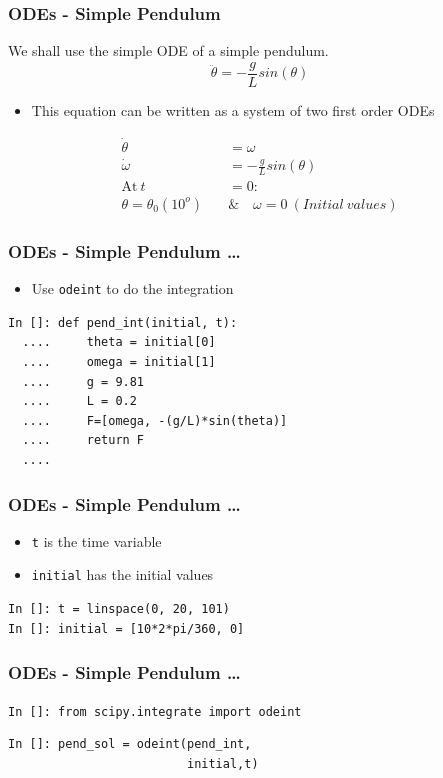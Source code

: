 \documentclass[14pt,compress]{beamer}
\newcounter{time}
\newcommand{\typ}[1]{\lstinline{#1}}
\begin{document}
\begin{frame}[fragile]
\frametitle{ODEs - Simple Pendulum}
We shall use the simple ODE of a simple pendulum. 
\begin{equation*}
\ddot{\theta} = -\frac{g}{L}sin(\theta)
\end{equation*}
\begin{itemize}
\item This equation can be written as a system of two first order ODEs
\end{itemize}
\begin{align}
\dot{\theta} &= \omega \\
\dot{\omega} &= -\frac{g}{L}sin(\theta) \\
 \text{At}\ t &= 0 : \nonumber \\
 \theta = \theta_0(10^o)\quad & \&\quad  \omega = 0\ (Initial\ values)\nonumber 
\end{align}
\end{frame}

\begin{frame}[fragile]
\frametitle{ODEs - Simple Pendulum \ldots}
\begin{itemize}
\item Use \typ{odeint} to do the integration
\end{itemize}
\begin{lstlisting}
In []: def pend_int(initial, t):
  ....     theta = initial[0]
  ....     omega = initial[1]
  ....     g = 9.81
  ....     L = 0.2
  ....     F=[omega, -(g/L)*sin(theta)]
  ....     return F
  ....
\end{lstlisting}
\end{frame}

\begin{frame}[fragile]
\frametitle{ODEs - Simple Pendulum \ldots}
\begin{itemize}
\item \typ{t} is the time variable \\ 
\item \typ{initial} has the initial values
\end{itemize}
\begin{lstlisting}
In []: t = linspace(0, 20, 101)
In []: initial = [10*2*pi/360, 0]
\end{lstlisting} 
\end{frame}

\begin{frame}[fragile]
\frametitle{ODEs - Simple Pendulum \ldots}
\typ{In []: from scipy.integrate import odeint}
\begin{lstlisting}
In []: pend_sol = odeint(pend_int, 
                         initial,t)
\end{lstlisting}
\end{frame}
\end{document}

